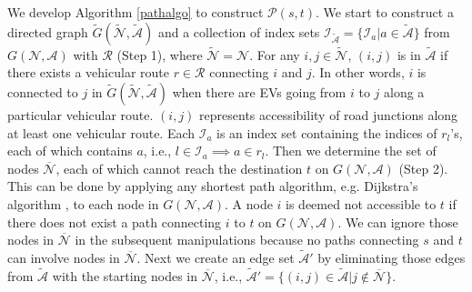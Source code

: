 \documentclass[journal]{IEEEtran}
\begin{document}
We develop Algorithm \ref{pathalgo} to construct $\mathcal{P}(s,t)$. We start to construct a directed graph $\tilde{G}(\tilde{\mathcal{N}},\tilde{\mathcal{A}})$ and a collection of index sets $\mathcal{I}_{\tilde{\mathcal{A}}}=\{\mathcal{I}_{a}|a\in \tilde{\mathcal{A}}\}$ from $G(\mathcal{N},\mathcal{A})$ with $\mathcal{R}$ (Step 1), where $\tilde{\mathcal{N}}=\mathcal{N}$. For any $i,j\in \tilde{\mathcal{N}}$, $(i,j)$ is in $\tilde{\mathcal{A}}$ if there exists a vehicular route $r\in\mathcal{R}$ connecting $i$ and $j$. In other words, $i$ is connected to $j$ in $\tilde{G}(\tilde{\mathcal{N}},\tilde{\mathcal{A}})$ when there are EVs going from $i$ to $j$ along a particular vehicular route. $(i,j)$ represents accessibility of road junctions along at least one  vehicular route. 
Each $\mathcal{I}_a$ is an index set containing the indices of $r_l$'s, each of which contains $a$, i.e., $l\in \mathcal{I}_a \implies a\in r_l$. 
Then we determine the set of nodes $\overline{\mathcal{N}}$, each  of which cannot reach the destination $t$ on $G(\mathcal{N},\mathcal{A})$ (Step 2). This can be done by applying any shortest path algorithm, e.g. Dijkstra's algorithm \cite{dijkstra},  to each node in $G(\mathcal{N},\mathcal{A})$. A node $i$ is deemed not accessible to $t$ if there does not exist a path connecting $i$ to $t$ on  $G(\mathcal{N},\mathcal{A})$. We can ignore those nodes in $\overline{\mathcal{N}}$ in the subsequent manipulations because no paths connecting $s$ and $t$ can involve nodes in $\overline{\mathcal{N}}$.
Next we create an edge set $\tilde{\mathcal{A}}'$ by eliminating those edges from $\tilde{\mathcal{A}}$ with the starting nodes in $\overline{\mathcal{N}}$, i.e., $\tilde{\mathcal{A}}'=\{(i,j)\in \tilde{\mathcal{A}}|j\not\in \overline{\mathcal{N}}\}$. 
\end{document}
